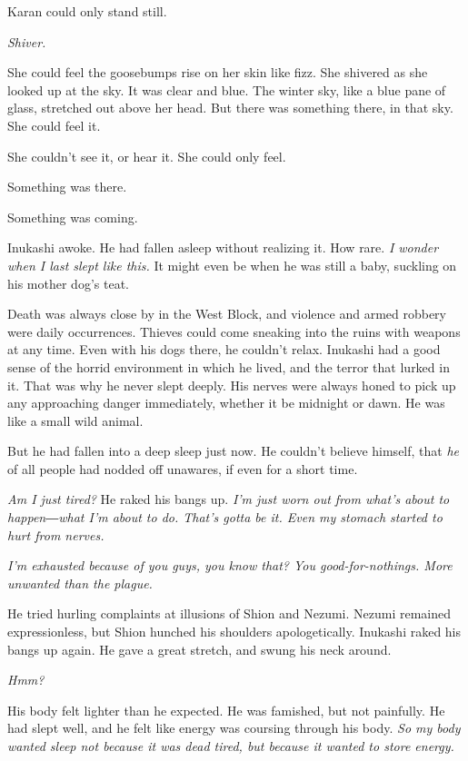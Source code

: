 Karan could only stand still.

\emph{Shiver.}

She could feel the goosebumps rise on her skin like fizz. She shivered
as she looked up at the sky. It was clear and blue. The winter sky, like
a blue pane of glass, stretched out above her head. But there was
something there, in that sky. She could feel it.

She couldn't see it, or hear it. She could only feel.

Something was there.

Something was coming.


Inukashi awoke. He had fallen asleep without realizing it. How rare. \emph{I
	wonder when I last slept like this.} It might even be when he was still a
baby, suckling on his mother dog's teat.

Death was always close by in the West Block, and violence and armed
robbery were daily occurrences. Thieves could come sneaking into the
ruins with weapons at any time. Even with his dogs there, he couldn't
relax. Inukashi had a good sense of the horrid environment in which he
lived, and the terror that lurked in it. That was why he never slept
deeply. His nerves were always honed to pick up any approaching danger
immediately, whether it be midnight or dawn. He was like a small wild
animal.

But he had fallen into a deep sleep just now. He couldn't believe
himself, that \emph{he} of all people had nodded off unawares, if even for a
short time.

\emph{Am I just tired?} He raked his bangs up. \emph{I'm just worn out from what's
	about to happen―what I'm about to do. That's gotta be it. Even my
	stomach started to hurt from nerves.}

\emph{I'm exhausted because of you guys, you know that? You good-for-nothings.
	More unwanted than the plague.}

He tried hurling complaints at illusions of Shion and Nezumi. Nezumi
remained expressionless, but Shion hunched his shoulders apologetically.
Inukashi raked his bangs up again. He gave a great stretch, and swung
his neck around.

\emph{Hmm?}

His body felt lighter than he expected. He was famished, but not
painfully. He had slept well, and he felt like energy was coursing
through his body. \emph{So my body wanted sleep not because it was dead tired,
	but because it wanted to store energy.}

